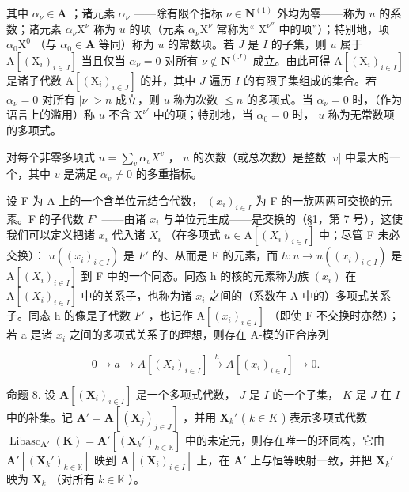 其中 \(\alpha_{\nu} \in \mathbf{A}\) ；诸元素 \(\alpha_{\nu}\) ——除有限个指标 \(\nu \in \mathbf{N}^{(1)}\) 外均为零——称为 \(u\) 的系数；诸元素 \(\alpha_{\nu} \mathrm{X}^{\nu}\) 称为 \(u\) 的项（元素 \(\alpha_{\nu} \mathrm{X}^{\nu}\) 常称为“ \(\mathrm{X}^{\nu''}\) 中的项”）；特别地，项 \(\alpha_{0} \mathrm{X}^{0}\) （与 \(\alpha_{0} \in \mathbf{A}\) 等同）称为 \(u\) 的常数项。若 \(J\) 是 \(I\) 的子集，则 \(u\) 属于 \(\mathrm{A}[(\mathrm{X}_{i})_{i \in J}]\) 当且仅当 \(\alpha_{\nu} = 0\) 对所有 \(\nu \notin \mathbf{N}^{(J)}\) 成立。由此可得 \(\mathrm{A}[(\mathrm{X}_{i})_{i \in I}]\) 是诸子代数 \(\mathrm{A}[(\mathrm{X}_{i})_{i \in J}]\) 的并，其中 \(J\) 遍历 \(I\) 的有限子集组成的集合。若 \(\alpha_{\nu} = 0\) 对所有 \(|\nu| > n\) 成立，则 \(u\) 称为次数 \(\leqslant n\) 的多项式。当 \(\alpha_{\nu} = 0\) 时，（作为语言上的滥用）称 \(u\) 不含 \(\mathrm{X}^{\nu'}\) 中的项；特别地，当 \(\alpha_{0} = 0\) 时， \(u\) 称为无常数项的多项式。

对每个非零多项式 \(u = \sum_{v} \alpha_v X^v\) ， \(u\) 的次数（或总次数）是整数 \(|v|\) 中最大的一个，其中 \(v\) 是满足 \(\alpha_v \neq 0\) 的多重指标。

设 F 为 A 上的一个含单位元结合代数， \((x_{i})_{i\in I}\) 为 F 的一族两两可交换的元素。F 的子代数 \(F'\) ——由诸 \(x_{i}\) 与单位元生成——是交换的（§1，第 7 号），这使我们可以定义把诸 \(x_{i}\) 代入诸 \(X_{i}\) （在多项式 \(u\in\mathrm{A}[(X_{i})_{i\in I}]\) 中；尽管 F 未必交换）： \(u((x_{i})_{i\in I})\) 是 \(F'\) 的、从而是 F 的元素，而 \(h\colon u\to u((x_{i})_{i\in I})\) 是 \(\mathrm{A}[(X_{i})_{i\in I}]\) 到 F 中的一个同态。同态 h 的核的元素称为族 \((x_{i})\) 在 \(\mathrm{A}[(X_{i})_{i\in I}]\) 中的关系子，也称为诸 \(x_{i}\) 之间的（系数在 A 中的）多项式关系子。同态 h 的像是子代数 \(F'\) ，也记作 \(\mathrm{A}[(x_{i})_{i\in I}]\) （即使 F 不交换时亦然）；若 a 是诸 \(x_{i}\) 之间的多项式关系子的理想，则存在 A-模的正合序列

\[
0 \longrightarrow a \longrightarrow A [ (X _ {i}) _ {i \in I} ] \stackrel {h} {\longrightarrow} A [ (x _ {i}) _ {i \in I} ] \longrightarrow 0.
\]

命题 8. 设 \(\mathbf{A}[(\mathbf{X}_i)_{i\in I}]\) 是一个多项式代数， \(J\) 是 \(I\) 的一个子集， \(K\) 是 \(J\) 在 \(I\) 中的补集。记 \(\mathbf{A}' = \mathbf{A}[(\mathbf{X}_j)_{j\in J}]\) ，并用 \(\mathbf{X}_k'\) ( \(k\in K\) ) 表示多项式代数 \(\operatorname{Libasc}_{\mathbf{A}'}(\mathbf{K}) = \mathbf{A}'[(\mathbf{X}_k')_{k \in \mathbb{K}}]\) 中的未定元，则存在唯一的环同构，它由 \(\mathbf{A}'[(\mathbf{X}_k')_{k \in \mathbb{K}}]\) 映到 \(\mathbf{A}[(\mathbf{X}_i)_{i \in I}]\) 上，在 \(\mathbf{A}'\) 上与恒等映射一致，并把 \(\mathbf{X}_k'\) 映为 \(\mathbf{X}_k\) （对所有 \(k \in \mathbb{K}\) ）。

